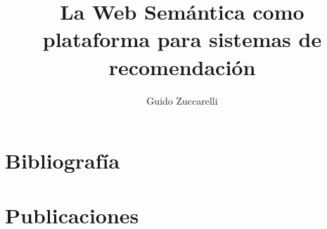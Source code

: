 \documentclass[10pt]{report}
\title{La Web Semántica como plataforma para sistemas de recomendación}
\author{Guido Zuccarelli}
\begin{document}
\maketitle

\tableofcontents





















	







\chapter{Bibliografía}



\appendix
\label{anexo}

\chapter{Publicaciones}
\end{document}
